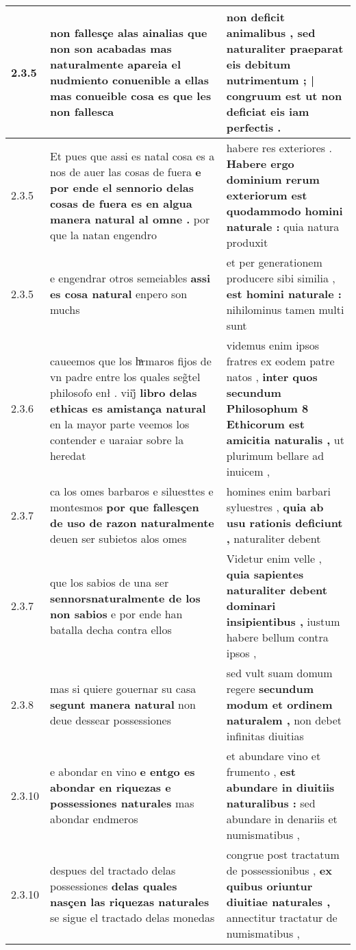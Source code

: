 \begin{tabular}{|p{1cm}|p{6.5cm}|p{6.5cm}|}
2.3.5 & non fallesçe alas ainalias \textbf{ que non son acabadas mas naturalmente apareia el nudmiento conuenible a ellas mas conueible cosa es } que les non fallesca & non deficit animalibus , \textbf{ sed naturaliter praeparat eis debitum nutrimentum ; | congruum est } ut non deficiat eis iam perfectis . \\\hline
2.3.5 & Et pues que assi es natal cosa es a nos de auer las cosas de fuera \textbf{ e por ende el sennorio delas cosas de fuera es en algua manera natural al omne . } por que la natan engendro & habere res exteriores . \textbf{ Habere ergo dominium rerum exteriorum est quodammodo homini naturale : } quia natura produxit \\\hline
2.3.5 & e engendrar otros semeiables \textbf{ assi es cosa natural } enpero son muchs & et per generationem producere sibi similia , \textbf{ est homini naturale : } nihilominus tamen multi sunt \\\hline
2.3.6 & caueemos que los hͣrmaros fijos de vn padre entre los quales seg̃tel philosofo enł . viij̊ \textbf{ libro delas ethicas es amistança natural } en la mayor parte veemos los contender e uaraiar sobre la heredat & videmus enim ipsos fratres ex eodem patre natos , \textbf{ inter quos secundum Philosophum 8 Ethicorum est amicitia naturalis , } ut plurimum bellare ad inuicem , \\\hline
2.3.7 & ca los omes barbaros e siluesttes e montesmos \textbf{ por que fallesçen de uso de razon naturalmente } deuen ser subietos alos omes & homines enim barbari syluestres , \textbf{ quia ab usu rationis deficiunt , } naturaliter debent \\\hline
2.3.7 & que los sabios de una ser \textbf{ sennorsnaturalmente de los non sabios } e por ende han batalla decha contra ellos & Videtur enim velle , \textbf{ quia sapientes naturaliter debent dominari insipientibus , } iustum habere bellum contra ipsos , \\\hline
2.3.8 & mas si quiere gouernar su casa \textbf{ segunt manera natural } non deue dessear possessiones & sed vult suam domum regere \textbf{ secundum modum et ordinem naturalem , } non debet infinitas diuitias \\\hline
2.3.10 & e abondar en vino \textbf{ e entgo es abondar en riquezas e possessiones naturales } mas abondar endmeros & et abundare vino et frumento , \textbf{ est abundare in diuitiis naturalibus : } sed abundare in denariis et numismatibus , \\\hline
2.3.10 & despues del tractado delas possessiones \textbf{ delas quales nasçen las riquezas naturales } se sigue el tractado delas monedas & congrue post tractatum de possessionibus , \textbf{ ex quibus oriuntur diuitiae naturales , } annectitur tractatur de numismatibus , \\\hline

\end{tabular}
